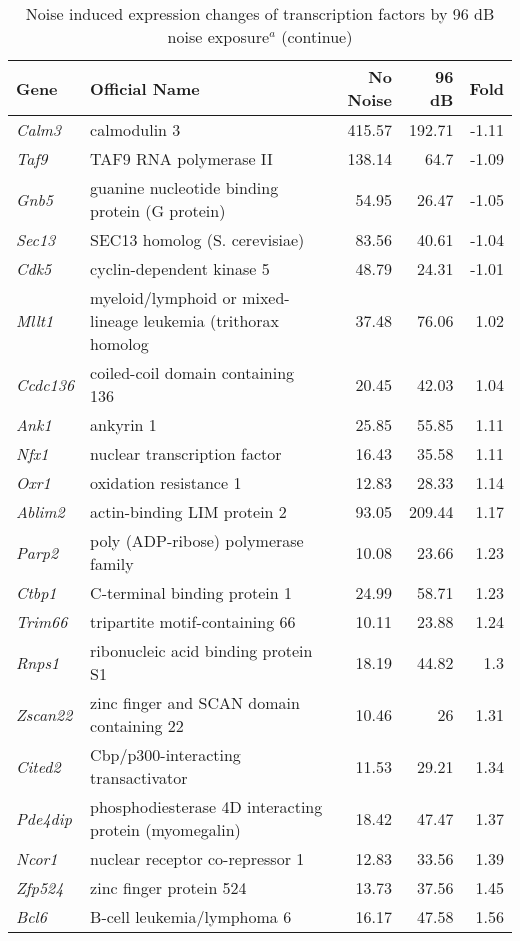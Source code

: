 \documentclass{article}
\begin{document}
\begin{table} 
\caption{Noise induced expression changes of transcription factors by 96 dB noise exposure$^a$ (continue)}
\begin{small}
\begin{tabular}{l p{2.5in }rrr}
  \hline
 Gene& Official Name & No Noise & 96 dB & Fold \\ 
  \hline
{\it  Calm3 }& calmodulin 3 &415.57&192.71&-1.11 \\
{\it  Taf9 }& TAF9 RNA polymerase II &138.14&64.7&-1.09 \\
{\it  Gnb5 }& guanine nucleotide binding protein (G protein) &54.95&26.47&-1.05 \\
{\it  Sec13 }& SEC13 homolog (S. cerevisiae) &83.56&40.61&-1.04 \\
{\it  Cdk5 }& cyclin-dependent kinase 5 &48.79&24.31&-1.01 \\
{\it  Mllt1 }& myeloid/lymphoid or mixed-lineage leukemia (trithorax homolog &37.48&76.06&1.02 \\
{\it  Ccdc136 }& coiled-coil domain containing 136 &20.45&42.03&1.04 \\
{\it  Ank1 }& ankyrin 1 &25.85&55.85&1.11 \\
{\it  Nfx1 }& nuclear transcription factor &16.43&35.58&1.11 \\
{\it  Oxr1 }& oxidation resistance 1 &12.83&28.33&1.14 \\
{\it  Ablim2 }& actin-binding LIM protein 2 &93.05&209.44&1.17 \\
{\it  Parp2 }& poly (ADP-ribose) polymerase family &10.08&23.66&1.23 \\
{\it  Ctbp1 }& C-terminal binding protein 1 &24.99&58.71&1.23 \\
{\it  Trim66 }& tripartite motif-containing 66 &10.11&23.88&1.24 \\
{\it  Rnps1 }& ribonucleic acid binding protein S1 &18.19&44.82&1.3 \\
{\it  Zscan22 }& zinc finger and SCAN domain containing 22 &10.46&26&1.31 \\
{\it  Cited2 }& Cbp/p300-interacting transactivator &11.53&29.21&1.34 \\
{\it  Pde4dip }& phosphodiesterase 4D interacting protein (myomegalin) &18.42&47.47&1.37 \\
{\it  Ncor1 }& nuclear receptor co-repressor 1 &12.83&33.56&1.39 \\
{\it  Zfp524 }& zinc finger protein 524 &13.73&37.56&1.45 \\
{\it  Bcl6 }& B-cell leukemia/lymphoma 6 &16.17&47.58&1.56 \\

\end{tabular}
\end{small}
\end{table}
\end{document}
